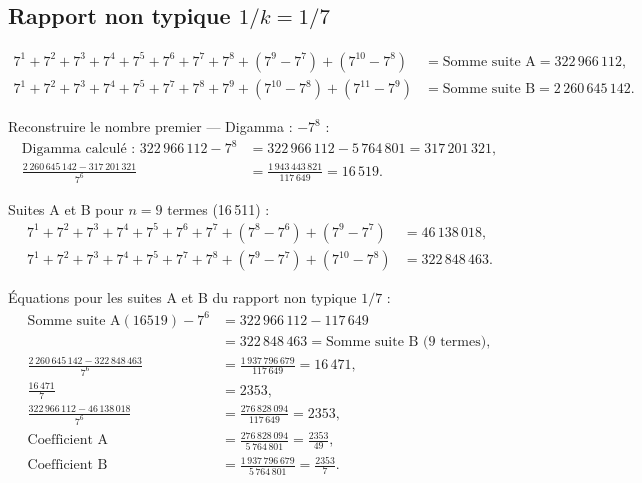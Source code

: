 \documentclass[11pt,a4paper]{article}
\begin{document}
\begin{boitenote}
\begin{boitenote}[Inspiration]
\begin{boitenote}
\subsection{Rapport non typique $1/k = 1/7$}

\vspace{0.3cm}
\begin{boiteformule}[Sommes des suites A et B --- rapport $1/7$, $n = 10$]
\begin{align*}
7^{1}+7^{2}+7^{3}+7^{4}+7^{5}+7^{6}+7^{7}+7^{8}+(7^{9}-7^{7})+(7^{10}-7^{8})
  &= \text{Somme suite A} = 322\,966\,112,\\
7^{1}+7^{2}+7^{3}+7^{4}+7^{5}+7^{7}+7^{8}+7^{9}+(7^{10}-7^{8})+(7^{11}-7^{9})
  &= \text{Somme suite B} = 2\,260\,645\,142.
\end{align*}
\end{boiteformule}

Reconstruire le nombre premier --- Digamma : $-7^{8}$ :
\begin{align*}
\text{Digamma calculé : }322\,966\,112-7^{8}
&=322\,966\,112-5\,764\,801=317\,201\,321,\\
\frac{2\,260\,645\,142-317\,201\,321}{7^{6}}
&=\frac{1\,943\,443\,821}{117\,649}=16\,519.
\end{align*}

Suites A et B pour $n = 9$ termes (16\,511) :
\begin{align*}
7^{1}+7^{2}+7^{3}+7^{4}+7^{5}+7^{6}+7^{7}+(7^{8}-7^{6})+(7^{9}-7^{7}) &= 46\,138\,018,\\
7^{1}+7^{2}+7^{3}+7^{4}+7^{5}+7^{7}+7^{8}+(7^{9}-7^{7})+(7^{10}-7^{8}) &= 322\,848\,463.
\end{align*}

Équations pour les suites A et B du rapport non typique $1/7$ :
\begin{align*}
\text{Somme suite A}(16519)-7^{6}
&=322\,966\,112-117\,649\\
&=322\,848\,463=\text{Somme suite B (9 termes)},\\
\frac{2\,260\,645\,142-322\,848\,463}{7^{6}}
&=\frac{1\,937\,796\,679}{117\,649}=16\,471,\\
\frac{16\,471}{7} &=2353,\\
\frac{322\,966\,112-46\,138\,018}{7^{6}}
&=\frac{276\,828\,094}{117\,649}=2353,\\
\text{Coefficient A}
&=\frac{276\,828\,094}{5\,764\,801}=\frac{2353}{49},\\
\text{Coefficient B}
&=\frac{1\,937\,796\,679}{5\,764\,801}=\frac{2353}{7}.
\end{align*}


\end{boitenote}
\end{boitenote}
\end{boitenote}
\end{document}
